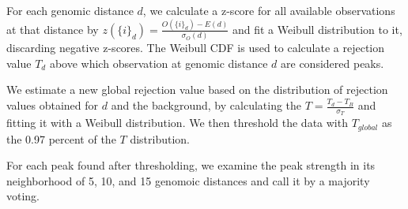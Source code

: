 \documentclass[12pt]{article}
\begin{document}
For each genomic distance $d$, we calculate a z-score for all available observations at that distance by $z({\{i\}_d})=\frac{O({\{i\}_d})-E(d)}{\sigma_{O}(d)}$ and fit a Weibull distribution to it, discarding negative z-scores. The Weibull CDF is used to calculate a rejection value $T_d$ above which observation at genomic distance $d$ are considered peaks. 

We estimate a new global rejection value based on the distribution of rejection values obtained for $d$ and the background, by calculating the $T = \frac{T_d-T_B}{\sigma_T}$ and fitting it with a Weibull distribution. We then threshold the data with $T_{global}$ as the 0.97 percent of the $T$ distribution. 

For each peak found after thresholding, we examine the peak strength in its neighborhood of 5, 10, and 15 genomoic distances and call it by a majority voting. 
 
\end{document}
